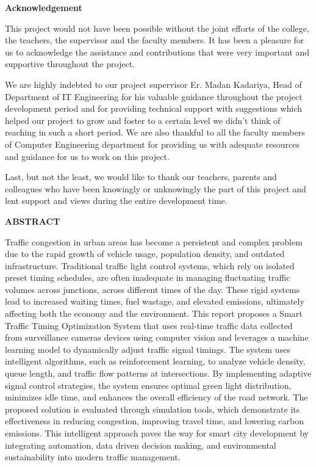 \documentclass[12pt, a4paper, oneside]{article}
\begin{document}
\large
\begin{center}
	\textbf{Acknowledgement}
\end{center}

\normalsize

This project would not have been possible without the joint efforts of the college, the teachers, the supervisor and the faculty members. It has been a pleasure for us to acknowledge the assistance and contributions that were very important and supportive throughout the project.

We are highly indebted to our project supervisor Er. Madan Kadariya, Head of Department of IT Engineering for his valuable guidance throughout the project development period and for providing technical support with suggestions which helped our project to grow and foster to a certain level we didn’t think of reaching in such a short period. We are also thankful to all the faculty members of Computer Engineering department for providing us with adequate resources and guidance for us to work on this project.

Last, but not the least, we would like to thank our teachers, parents and colleagues who have been knowingly or unknowingly the part of this project and lent support and views during the entire development time.

\break





\large
\begin{center}
	\textbf{ABSTRACT}
\end{center}
\normalsize
Traffic congestion in urban areas has become a persistent and complex problem due to the rapid growth of vehicle usage, population density, and outdated infrastructure. 
Traditional traffic light control systems, which rely on isolated preset timing schedules, are often inadequate in managing fluctuating traffic volumes across junctions, across different times of the day. 
These rigid systems lead to increased waiting times, fuel wastage, and elevated emissions, ultimately affecting both the economy and the environment. 
This report proposes a Smart Traffic Timing Optimization System that uses real-time traffic data collected from surveillance cameras devices using computer vision and leverages a machine learning model to dynamically adjust traffic signal timings. 
The system uses intelligent algorithms, such as  reinforcement learning, to analyze vehicle density, queue length, and traffic flow patterns at intersections. 
By implementing adaptive signal control strategies, the system ensures optimal green light distribution, minimizes idle time, and enhances the overall efficiency of the road network. 
The proposed solution is evaluated through simulation tools, which demonstrate its effectiveness in reducing congestion, improving travel time, and lowering carbon emissions. 
This intelligent approach paves the way for smart city development by integrating automation, data driven decision making, and environmental sustainability into modern traffic management.
\end{document}
